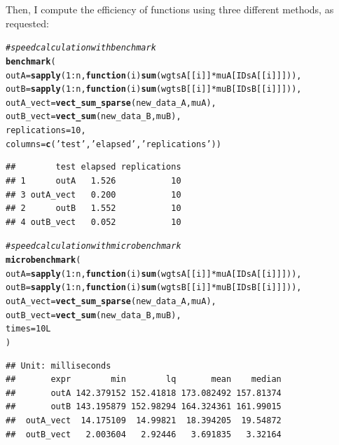 \documentclass{llncs}\usepackage[]{graphicx}\usepackage[]{color}
\makeatletter
\newcommand{\hlnum}[1]{\textcolor[rgb]{0.686,0.059,0.569}{#1}}%
\newcommand{\hlstr}[1]{\textcolor[rgb]{0.192,0.494,0.8}{#1}}%
\newcommand{\hlcom}[1]{\textcolor[rgb]{0.678,0.584,0.686}{\textit{#1}}}%
\newcommand{\hlopt}[1]{\textcolor[rgb]{0,0,0}{#1}}%
\newcommand{\hlstd}[1]{\textcolor[rgb]{0.345,0.345,0.345}{#1}}%
\newcommand{\hlkwa}[1]{\textcolor[rgb]{0.161,0.373,0.58}{\textbf{#1}}}%
\newcommand{\hlkwc}[1]{\textcolor[rgb]{0.333,0.667,0.333}{#1}}%
\newcommand{\hlkwd}[1]{\textcolor[rgb]{0.737,0.353,0.396}{\textbf{#1}}}%
\newenvironment{kframe}{%
 \def\at@end@of@kframe{}%
 \ifinner\ifhmode%
  \def\at@end@of@kframe{\end{minipage}}%
  \begin{minipage}{\columnwidth}%
 \fi\fi%
 \def\FrameCommand##1{\hskip\@totalleftmargin \hskip-\fboxsep
 \colorbox{shadecolor}{##1}\hskip-\fboxsep
     \hskip-\linewidth \hskip-\@totalleftmargin \hskip\columnwidth}%
 \MakeFramed {\advance\hsize-\width
   \@totalleftmargin\z@ \linewidth\hsize
   \@setminipage}}%
 {\par\unskip\endMakeFramed%
 \at@end@of@kframe}
\newenvironment{knitrout}{}{} %
\makeatother
\begin{document}
\noindent
Then, I compute the efficiency of functions using three different methods, as requested:
\begin{knitrout}
\color{fgcolor}\begin{kframe}
\begin{alltt}
\hlcom{# speed calculation with benchmark}
\hlkwd{benchmark}\hlstd{(}
  \hlkwc{outA} \hlstd{=} \hlkwd{sapply}\hlstd{(}\hlnum{1}\hlopt{:}\hlstd{n,}\hlkwa{function}\hlstd{(}\hlkwc{i}\hlstd{)} \hlkwd{sum}\hlstd{(wgtsA[[i]]}\hlopt{*}\hlstd{muA[IDsA[[i]]])),}
  \hlkwc{outB} \hlstd{=} \hlkwd{sapply}\hlstd{(}\hlnum{1}\hlopt{:}\hlstd{n,}\hlkwa{function}\hlstd{(}\hlkwc{i}\hlstd{)} \hlkwd{sum}\hlstd{(wgtsB[[i]]}\hlopt{*}\hlstd{muB[IDsB[[i]]])),}
  \hlkwc{outA_vect}\hlstd{=}\hlkwd{vect_sum_sparse}\hlstd{(new_data_A,muA),}
  \hlkwc{outB_vect}\hlstd{=}\hlkwd{vect_sum}\hlstd{(new_data_B,muB),}
  \hlkwc{replications} \hlstd{=} \hlnum{10}\hlstd{,}
  \hlkwc{columns}\hlstd{=}\hlkwd{c}\hlstd{(}\hlstr{'test'}\hlstd{,} \hlstr{'elapsed'}\hlstd{,} \hlstr{'replications'}\hlstd{))}
\end{alltt}
\begin{lstlisting}[basicstyle=\ttfamily,breaklines=true]
##        test elapsed replications
## 1      outA   1.526           10
## 3 outA_vect   0.200           10
## 2      outB   1.552           10
## 4 outB_vect   0.052           10
\end{lstlisting}
\begin{alltt}
\hlcom{# speed calculation with microbenchmark}
\hlkwd{microbenchmark}\hlstd{(}
  \hlkwc{outA} \hlstd{=} \hlkwd{sapply}\hlstd{(}\hlnum{1}\hlopt{:}\hlstd{n,}\hlkwa{function}\hlstd{(}\hlkwc{i}\hlstd{)} \hlkwd{sum}\hlstd{(wgtsA[[i]]}\hlopt{*}\hlstd{muA[IDsA[[i]]])),}
  \hlkwc{outB} \hlstd{=} \hlkwd{sapply}\hlstd{(}\hlnum{1}\hlopt{:}\hlstd{n,}\hlkwa{function}\hlstd{(}\hlkwc{i}\hlstd{)} \hlkwd{sum}\hlstd{(wgtsB[[i]]}\hlopt{*}\hlstd{muB[IDsB[[i]]])),}
  \hlkwc{outA_vect}\hlstd{=}\hlkwd{vect_sum_sparse}\hlstd{(new_data_A,muA),}
  \hlkwc{outB_vect}\hlstd{=}\hlkwd{vect_sum}\hlstd{(new_data_B,muB),}
  \hlkwc{times} \hlstd{=} \hlnum{10L}
\hlstd{)}
\end{alltt}
\begin{lstlisting}[basicstyle=\ttfamily,breaklines=true]
## Unit: milliseconds
##       expr        min        lq       mean    median
##       outA 142.379152 152.41818 173.082492 157.81374
##       outB 143.195879 152.98294 164.324361 161.99015
##  outA_vect  14.175109  14.99821  18.394205  19.54872
##  outB_vect   2.003604   2.92446   3.691835   3.32164

\end{lstlisting}
\end{kframe}
\end{knitrout}
\end{document}
